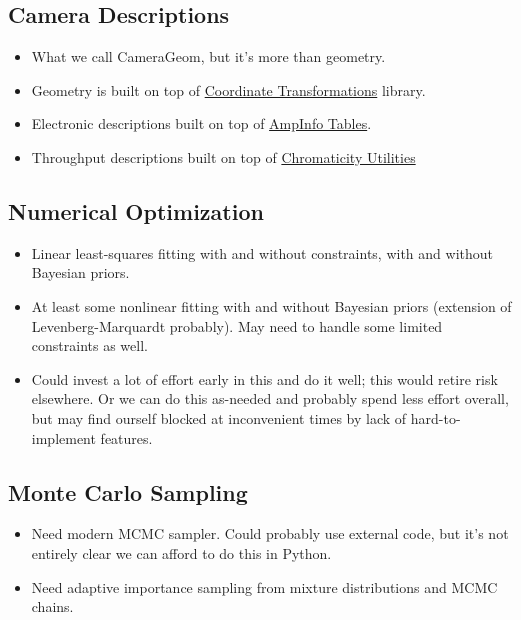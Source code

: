 \subsection{Camera Descriptions}
\label{sec:spCameraDescriptions}

\begin{itemize}
\item What we call CameraGeom, but it's more than geometry.
\item Geometry is built on top of \hyperref[sec:spWCS]{Coordinate Transformations} library.
\item Electronic descriptions built on top of \hyperref[sec:spTablesAmpInfo]{AmpInfo Tables}.
\item Throughput descriptions built on top of \hyperref[sec:spChromaticity]{Chromaticity Utilities}
\end{itemize}

\subsection{Numerical Optimization}
\label{sec:spOptimization}

\begin{itemize}
\item Linear least-squares fitting with and without constraints, with and without Bayesian priors.
\item At least some nonlinear fitting with and without Bayesian priors (extension of Levenberg-Marquardt probably).  May need to handle some limited constraints as well.
\item Could invest a lot of effort early in this and do it well; this would retire risk elsewhere.  Or we can do this as-needed and probably spend less effort overall, but may find ourself blocked at inconvenient times by lack of hard-to-implement features.
\end{itemize}

\subsection{Monte Carlo Sampling}
\label{sec:spMonte Carlo}

\begin{itemize}
\item Need modern MCMC sampler.  Could probably use external code, but it's not entirely clear we can afford to do this in Python.
\item Need adaptive importance sampling from mixture distributions and MCMC chains.
\end{itemize}

